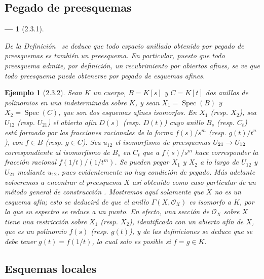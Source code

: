 \documentclass[oneside]{amsart}
\theoremstyle{ega-env-style}
\newtheorem*{env}{---}
\theoremstyle{ega-thm-env-style}
\theoremstyle{ega-defn-env-style}
\newtheorem*{example}{Ejemplo}
\renewcommand{\to}{\mathchoice{\longrightarrow}{\rightarrow}{\rightarrow}{\rightarrow}}
\newcommand{\oldpage}[2][]{{\marginnote{\normalfont{\textbf{#1}~|~#2}}}\ignorespaces}
\let\EGAOriginalLabel\label
\renewcommand{\label}[1]{\phantomsection\EGAOriginalLabel{#1}}
\begin{document}
\oldpage[I]{101}
\subsection{Pegado de preesquemas}
\label{subsection:I.2.3}

\begin{env}[2.3.1]
\label{I.2.3.1}

De la Definición~ se deduce que todo espacio anillado obtenido por \emph{pegado} de preesquemas  es también un preesquema.
En particular, puesto que todo preesquema admite, por definición, un recubrimiento por abiertos afines, se ve que todo preesquema puede obtenerse por \emph{pegado de esquemas afines}.
\end{env}

\begin{example}[2.3.2]
\label{I.2.3.2}
Sean $K$ un cuerpo, $B=K[s]$ y $C=K[t]$ dos anillos de polinomios en una indeterminada sobre $K$, y sean $X_1=\operatorname{Spec}(B)$ y $X_2=\operatorname{Spec}(C)$, que son dos esquemas afines isomorfos.
En $X_1$ (resp. $X_2$), sea $U_{12}$ (resp. $U_{21}$) el abierto afín $D(s)$ (resp. $D(t)$) cuyo anillo $B_s$ (resp. $C_t$) está formado por las fracciones racionales de la forma $f(s)/s^m$ (resp. $g(t)/t^n$), con $f\in B$ (resp. $g\in C$).
Sea $u_{12}$ el isomorfismo de preesquemas $U_{21}\to U_{12}$ correspondiente  al isomorfismo de $B_s$ en $C_t$ que a $f(s)/s^m$ hace corresponder la fracción racional $f(1/t)/(1/t^m)$.
Se pueden pegar $X_1$ y $X_2$ a lo largo de $U_{12}$ y $U_{21}$ mediante $u_{12}$, pues evidentemente no hay condición de pegado.
Más adelante volveremos a encontrar el preesquema $X$ así obtenido como caso particular de un método general de construcción .
Mostremos aquí solamente que $X$ \emph{no es un esquema afín};
esto se deducirá de que el anillo $\Gamma(X,\mathscr{O}_X)$ es \emph{isomorfo a} $K$, por lo que su espectro se reduce a un punto.
En efecto, una sección de $\mathscr{O}_X$ sobre $X$ tiene una restricción sobre $X_1$ (resp. $X_2$), identificado con un abierto afín de $X$, que es un polinomio $f(s)$ (resp. $g(t)$), y de las definiciones se deduce que se debe tener $g(t)=f(1/t)$, lo cual solo es posible si $f=g\in K$.
\end{example}

\subsection{Esquemas locales}
\label{subsection:I.2.4}
\end{document}
